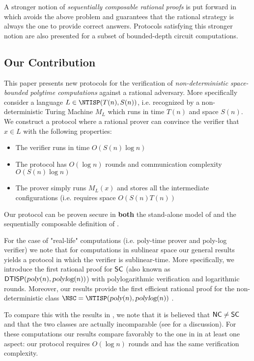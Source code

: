 A stronger notion of {\em sequentially composable rational proofs} is put forward in \cite{cg15} which avoids the above problem and guarantees that the rational strategy is always the one to provide correct answers. Protocols satisfying this stronger notion are also presented for a subset of bounded-depth circuit computations. 

\subsection{Our Contribution}

This paper presents new protocols for the verification of {\em non-deterministic space-bounded polytime computations} against a rational adversary. More specifically consider a language $L \in \NTISP(T(n), S(n))$, i.e. recognized by a non-deterministic Turing Machine $M_L$ which runs in time $T(n)$ and space $S(n)$. 
We construct a protocol where a rational prover can
convince the verifier that $x \in L$ with the following properties: 
\begin{itemize}
\item The verifier runs in time $O(S(n) \log n)$
\item The protocol has $O(\log n)$ rounds and communication complexity $O(S(n) \log n)$
\item The prover simply runs $M_L(x)$ and stores all the intermediate configurations (i.e. requires space $O(S(n) T(n))$
\end{itemize}
Our protocol can be proven secure in {\bf both} the stand-alone model of \cite{am} and the sequentially composable definition of \cite{cg15}. 

For the case of "real-life" computations (i.e. poly-time prover and poly-log verifier) we 
note that for computations in sublinear space our general results yields a protocol in which the verifier is sublinear-time. More specifically, we introduce the first rational proof for ${\mathsf{SC}}$ (also known as ${\mathsf{DTISP}}({\textsl{poly}}(n), {\textsl{polylog}}(n))$) with polylogarithmic verification and logarithmic rounds. Moreover, our results provide the first efficient rational proof for the non-deterministic class $\NSC = \NTISP(\poly(n), \polylog(n) )$ . 

To compare this with the results in \cite{ratsumchecks}, we note that it is believed that ${\mathsf{NC}} \not = {\mathsf{SC}}$ and that the two classes are actually incomparable (see \cite{SCcompleteness} for a discussion).
 For these computations our results compare
favorably to the one in \cite{ratsumchecks} in at least one aspect: our protocol requires $O(\log n )$ rounds and has the same verification complexity.

